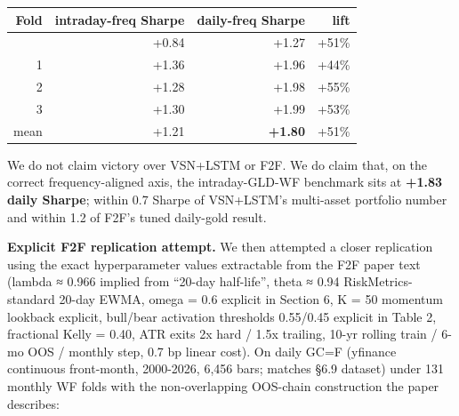 \documentclass[
]{article}
\newcounter{none} %
\begin{document}
{\def\LTcaptype{none} %
\begin{longtable}[]{@{}rrrr@{}}
\toprule\noalign{}
Fold & intraday-freq Sharpe & daily-freq Sharpe & lift \\
\midrule\noalign{}
\endhead
\bottomrule\noalign{}
\endlastfoot
0 & +0.84 & +1.27 & +51\% \\
1 & +1.36 & +1.96 & +44\% \\
2 & +1.28 & +1.98 & +55\% \\
3 & +1.30 & +1.99 & +53\% \\
mean & +1.21 & \textbf{+1.80} & +51\% \\
\end{longtable}
}

We do not claim victory over VSN+LSTM or F2F. We do claim that, on the
correct frequency-aligned axis, the intraday-GLD-WF benchmark sits at
\textbf{+1.83 daily Sharpe}; within 0.7 Sharpe of VSN+LSTM's multi-asset
portfolio number and within 1.2 of F2F's tuned daily-gold result.

\textbf{Explicit F2F replication attempt.} We then attempted a closer
replication using the exact hyperparameter values extractable from the
F2F paper text (lambda ≈ 0.966 implied from ``20-day half-life'', theta
≈ 0.94 RiskMetrics-standard 20-day EWMA, omega = 0.6 explicit in Section
6, K = 50 momentum lookback explicit, bull/bear activation thresholds
0.55/0.45 explicit in Table 2, fractional Kelly = 0.40, ATR exits 2x
hard / 1.5x trailing, 10-yr rolling train / 6-mo OOS / monthly step, 0.7
bp linear cost). On daily GC=F (yfinance continuous front-month,
2000-2026, 6,456 bars; matches §6.9 dataset) under 131 monthly WF folds
with the non-overlapping OOS-chain construction the paper describes:
\end{document}
